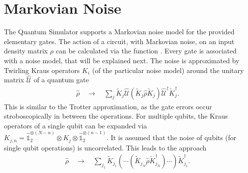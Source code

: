 \section{Markovian Noise}
The Quantum Simulator supports a Markovian noise model for the provided elementary gates. The action of a circuit, with Markovian noise, on an input density matrix $\rho$ can be calculated via the function . Every gate is associated with a noise model, that will be explained next. The noise is approximated by Twirling Kraus operators $K_i$ (of the particular noise model) around the unitary matrix $\hat{\mathcal{U}}$ of a quantum gate
\begin{align}
  \hat{\rho} \quad \rightarrow \quad  \sum_j \tilde{K}_j \hat{\mathcal{U}} \left(\tilde{K}_j\hat{\rho}\tilde{K}_j \right)\hat{\mathcal{U}}^{\dagger} \tilde{K}_j^{\dagger}.\nonumber
\end{align}
This is similar to the Trotter approximation, as the gate errors occur stroboscopically in between the operations. For multiple qubits, the Kraus operators of a single qubit can be expanded via $K_{j,n}=\hat{\mathds{1}}_{2}^{\otimes (N-n)}\otimes K_j \otimes \hat{\mathds{1}}_{2}^{\otimes (n-1)}$. It is assumed that the noise of qubits (for single qubit operations) is uncorrelated. This leads to the approach
\begin{align}
\hat{\rho} \quad \rightarrow \quad  \sum_{j_1} \tilde{K}_{j_1} \left(\cdots\left( \tilde{K}_{j_N} \hat{\rho} \tilde{K}_{j_N}^{\dagger}\right)\cdots\right) \tilde{K}_{j_1}^{\dagger}.\nonumber
\end{align}

